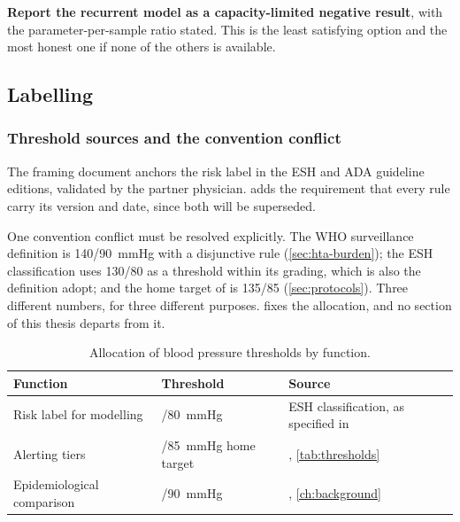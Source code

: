 \documentclass[12pt,a4paper,oneside]{report}
\begin{document}
\textbf{Report the recurrent model as a capacity-limited negative result}, with the parameter-per-sample ratio stated. This is the least satisfying option and the most honest one if none of the others is available.

\subsection{Labelling}\label{sec:labelling}

\subsubsection{Threshold sources and the convention conflict}

The framing document anchors the risk label in the ESH and ADA guideline editions, validated by the partner physician.  adds the requirement that every rule carry its version and date, since both will be superseded.

One convention conflict must be resolved explicitly. The WHO surveillance definition is 140/90~mmHg with a disjunctive rule (\cref{sec:hta-burden}); the ESH classification uses 130/80 as a threshold within its grading, which is also the definition \textcite{mendoza2025} adopt; and the home target of \textcite{mihevc2025} is 135/85 (\cref{sec:protocols}). Three different numbers, for three different purposes.  fixes the allocation, and no section of this thesis departs from it.

\begin{table}[htbp]
\centering\small
\caption{Allocation of blood pressure thresholds by function.}\label{tab:threshold-allocation}
\begin{tabularx}{\textwidth}{@{}>{\raggedright\arraybackslash}p{3.6cm} >{\raggedright\arraybackslash}p{2.6cm} X@{}}
\toprule
\textbf{Function} & \textbf{Threshold} & \textbf{Source} \\
\midrule
Risk label for modelling & 130/80~mmHg & ESH classification, as specified in \textcite{cadrage2026} \\
Alerting tiers & 135/85~mmHg home target & \textcite{mihevc2025}, \cref{tab:thresholds} \\
Epidemiological comparison & 140/90~mmHg & \textcite{who2023hypertension}, \cref{ch:background} \\
\bottomrule
\end{tabularx}
\end{table}
\end{document}
